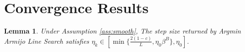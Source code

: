 \documentclass[10pt]{article} %
\newtheorem{lemma}[theorem]{Lemma}
\begin{document}



\beginSupplementaryMaterials

\section{Convergence Results} \label{sec:converge}

\begin{lemma} \label{lem:step_lower} Under Assumption \ref{ass:smooth}, The step size returned by \textit{Argmin Armijo Line Search} satisfies $\eta_k \in \left[ \min\{ \frac{2(1-c)}{L}, \eta_0 \beta^B\},  \eta_0 \right]$.  
\end{lemma}
\end{document}
